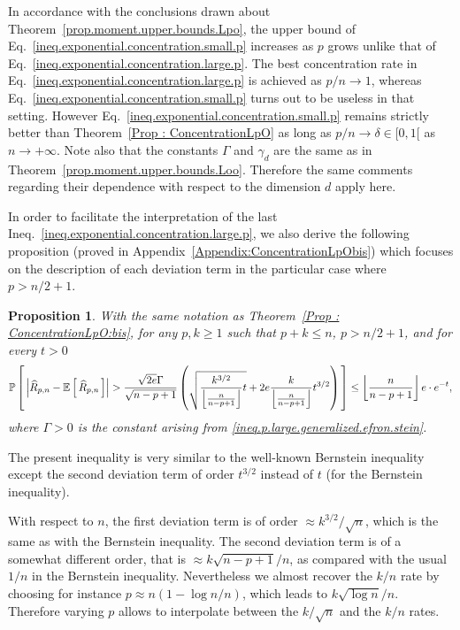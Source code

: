 \documentclass[twoside,11pt]{article}
\numberwithin{equation}{section}
\newtheorem{prop}{Proposition}[section]
\newcommand{\floor}[1]{\left\lfloor #1 \right\rfloor}
\newcommand{\1}{\mathds{1}}%
\newcommand{\paren}[1]{\left( #1 \right)}
\newcommand{\croch}[1]{\left[\, #1 \,\right]}
\newcommand{\abs}[1]{\left\lvert #1 \right\rvert} %
\newcommand{\E}{\mathbb{E}}
\renewcommand{\P}{\mathbb{P}}
\newcommand{\Rh}{\widehat{R}}
\numberwithin{equation}{section}
\theoremstyle{plain}
\begin{document}
In accordance with the conclusions drawn about Theorem~\ref{prop.moment.upper.bounds.Lpo}, the upper bound of Eq.~\eqref{ineq.exponential.concentration.small.p} increases as $p$ grows unlike that of Eq.~\eqref{ineq.exponential.concentration.large.p}.
%
The best concentration rate in Eq.~\eqref{ineq.exponential.concentration.large.p} is achieved as $p/n\to 1$, whereas Eq.~\eqref{ineq.exponential.concentration.small.p} turns out to be useless in that setting.
%
However	Eq.~\eqref{ineq.exponential.concentration.small.p} remains strictly better than Theorem~\ref{Prop : ConcentrationLpO} as long as $p/n \to \delta \in [0,1[ $ as $n\to +\infty$.
%
Note also that the constants $\Gamma$ and $\gamma_d$ are the same as in Theorem~\ref{prop.moment.upper.bounds.Loo}. Therefore the same comments regarding their dependence with respect to the dimension $d$ apply here.


\medskip

In order to facilitate the interpretation of the last Ineq.~\eqref{ineq.exponential.concentration.large.p}, we also derive the following proposition (proved in Appendix~\ref{Appendix:ConcentrationLpObis}) which focuses on the description of each deviation term in the particular case where $p> n/2+1$.
%
\begin{prop}\label{prop.exponential.inequality.p.large.explicit.deviations}
%
With the same notation as Theorem~\ref{Prop : ConcentrationLpO:bis}, for any $p,k\geq 1$ such that $p+k \leq n$, $p> n/2+1$, and for every $t>0$
\begin{align*}
 \P\croch{ \abs{\Rh_{p,n} - \E\croch{\Rh_{p,n}}} >  \frac{\sqrt{2e}\Gamma}{\sqrt{n-p+1}} \paren{\sqrt{\frac{k^{3/2}}{\floor{\frac{n}{n-p+1} } } t} +   2e  \frac{k}{\floor{\frac{n}{n-p+1} } } t^{3/2}   } } \leq \floor{\frac{n}{n-p+1}} e \cdot e^{-t} , \hfill
\end{align*}
where $\Gamma>0$ is the constant arising from \eqref{ineq.p.large.generalized.efron.stein}.
%
\end{prop}
%
The present inequality is very similar to the well-known Bernstein inequality \citep[][Theorem~2.10]{BouLugMas_2013} except the second deviation term of order $t^{3/2}$ instead of $t$ (for the Bernstein inequality).

With respect to $n$, the first deviation term is of order $\approx k^{3/2}/\sqrt{n}$, which is the same as with the Bernstein inequality.
%
The second deviation term is of a somewhat different order, that is $\approx k\sqrt{n-p+1}/n$, as compared with the usual $1/n$ in the Bernstein inequality.
%
Nevertheless we almost recover the $k/n$ rate by choosing for instance $p \approx n (1- \log n/n)$, which leads to $k \sqrt{\log n}/n$.
%
Therefore varying $p$ allows to interpolate between the $k/\sqrt{n}$ and the $k/n$ rates.
\end{document}
